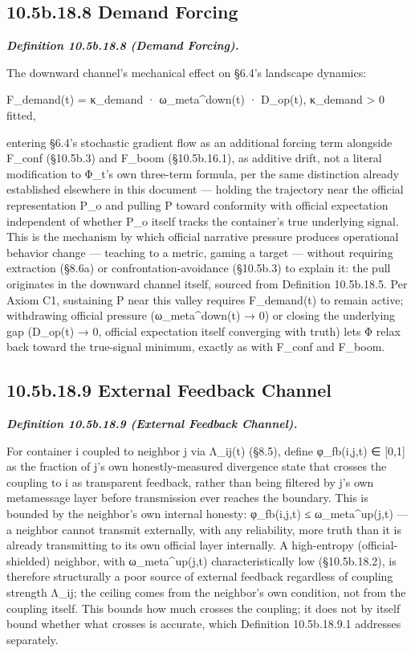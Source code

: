 \documentclass[
]{article}
\begin{document}
\hypertarget{b.18.8-demand-forcing}{%
\subsection{10.5b.18.8 Demand Forcing}\label{b.18.8-demand-forcing}}

\emph{\textbf{Definition 10.5b.18.8 (Demand Forcing).}}

The downward channel's mechanical effect on §6.4's landscape dynamics:

F\_demand(t) = κ\_demand · ω\_meta\^{}down(t) · D\_op(t), κ\_demand
\textgreater{} 0 fitted,

entering §6.4's stochastic gradient flow as an additional forcing term
alongside F\_conf (§10.5b.3) and F\_boom (§10.5b.16.1), as additive
drift, not a literal modification to Φ\_t's own three-term formula, per
the same distinction already established elsewhere in this document ---
holding the trajectory near the official representation P\_o and pulling
P toward conformity with official expectation independent of whether
P\_o itself tracks the container's true underlying signal. This is the
mechanism by which official narrative pressure produces operational
behavior change --- teaching to a metric, gaming a target --- without
requiring extraction (§8.6a) or confrontation-avoidance (§10.5b.3) to
explain it: the pull originates in the downward channel itself, sourced
from Definition 10.5b.18.5. Per Axiom C1, sustaining P near this valley
requires F\_demand(t) to remain active; withdrawing official pressure
(ω\_meta\^{}down(t) → 0) or closing the underlying gap (D\_op(t) → 0,
official expectation itself converging with truth) lets Φ relax back
toward the true-signal minimum, exactly as with F\_conf and F\_boom.

\hypertarget{b.18.9-external-feedback-channel}{%
\subsection{10.5b.18.9 External Feedback
Channel}\label{b.18.9-external-feedback-channel}}

\emph{\textbf{Definition 10.5b.18.9 (External Feedback Channel).}}

For container i coupled to neighbor j via Λ\_ij(t) (§8.5), define
φ\_fb(i,j,t) ∈ {[}0,1{]} as the fraction of j's own honestly-measured
divergence state that crosses the coupling to i as transparent feedback,
rather than being filtered by j's own metamessage layer before
transmission ever reaches the boundary. This is bounded by the
neighbor's own internal honesty: φ\_fb(i,j,t) ≤ ω\_meta\^{}up(j,t) --- a
neighbor cannot transmit externally, with any reliability, more truth
than it is already transmitting to its own official layer internally. A
high-entropy (official-shielded) neighbor, with ω\_meta\^{}up(j,t)
characteristically low (§10.5b.18.2), is therefore structurally a poor
source of external feedback regardless of coupling strength Λ\_ij; the
ceiling comes from the neighbor's own condition, not from the coupling
itself. This bounds how much crosses the coupling; it does not by itself
bound whether what crosses is accurate, which Definition 10.5b.18.9.1
addresses separately.
\end{document}
